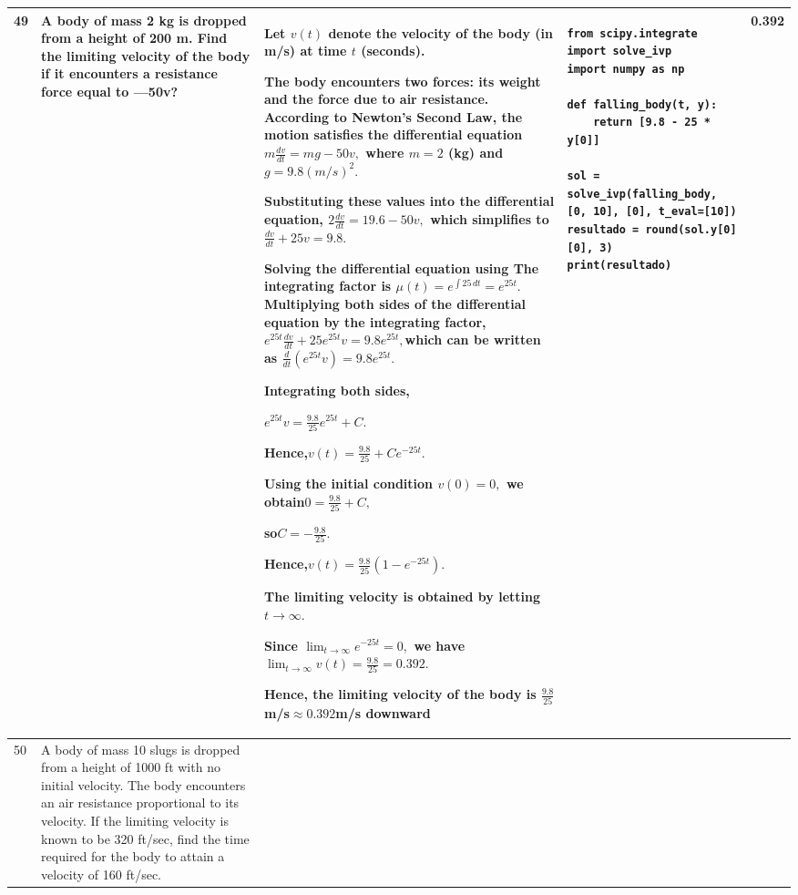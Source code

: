 \documentclass[a4paper,12pt]{article}
\begin{document}
\begin{longtable}{|p{0.3cm}|p{}|p{10cm}|p{}|p{1.5cm}|}
 49           & A body of mass 2 kg is dropped from a height of 200 m. Find the limiting velocity of the body if it encounters a
resistance force equal to —50v?


              &Let $v(t)$ denote the velocity of the body (in m/s) at time $t$ (seconds).

The body encounters two forces: its weight and the force due to air resistance. According to Newton's Second Law, the motion satisfies the differential equation
$m\frac{dv}{dt}=mg-50v,$
where $m=2$ (kg) and $g=9.8(m/s)^2.$

Substituting these values into the differential equation,
$2\frac{dv}{dt}=19.6-50v,$
which simplifies to
$\frac{dv}{dt}+25v=9.8.$

Solving the differential equation using The integrating factor is
$\mu(t)=e^{\int25\,dt}
=e^{25t}.$
Multiplying both sides of the differential equation by the integrating factor,
$e^{25t}\frac{dv}{dt}
+25e^{25t}v
=9.8e^{25t},
$which can be written as
$\frac{d}{dt}\left(e^{25t}v\right)
=9.8e^{25t}.$

Integrating both sides,

$e^{25t}v=\frac{9.8}{25}e^{25t}+C.$

Hence,$v(t)=\frac{9.8}{25}+Ce^{-25t}.$

Using the initial condition
$v(0)=0,$
we obtain$0=\frac{9.8}{25}+C,$

so$C=-\frac{9.8}{25}.$

Hence,$
v(t)=\frac{9.8}{25}\left(1-e^{-25t}\right).$

The limiting velocity is obtained by letting$t\to\infty.$

Since
$\lim_{t\to\infty}e^{-25t}=0,$ we have$\lim_{t\to\infty}v(t)=\frac{9.8}{25}=0.392.$

Hence, the limiting velocity of the body is
$\frac{9.8}{25}$ m/s$\approx0.392 $m/s downward


 &\begin{verbatim}
from scipy.integrate import solve_ivp
import numpy as np

def falling_body(t, y):
    return [9.8 - 25 * y[0]]

sol = solve_ivp(falling_body, [0, 10], [0], t_eval=[10])
resultado = round(sol.y[0][0], 3)
print(resultado)
\end{verbatim}&0.392   \\ \hline 

 50           & A body of mass 10 slugs is dropped from a height of 1000 ft with no initial velocity. The body encounters an air resistance proportional to its velocity. If the limiting velocity is known to be 320 ft/sec, find  the time required for the body to attain a velocity of 160 ft/sec.



\end{longtable}
\end{document}
